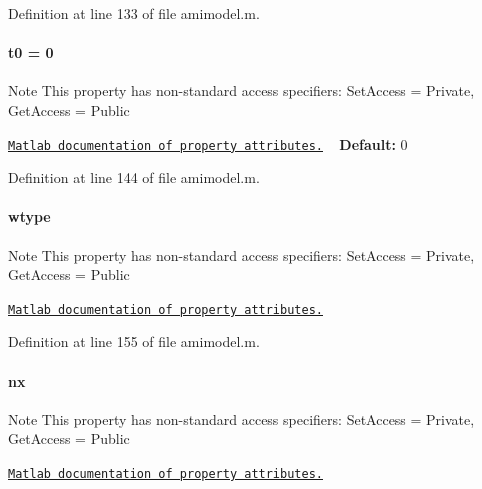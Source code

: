 Definition at line 133 of file amimodel.\+m.

\hypertarget{classamimodel_abdb5a42ffee3ca622484b53a322f1004}{}
\paragraph[{t0}]{\setlength{\rightskip}{0pt plus 5cm}t0 = 0}\label{classamimodel_abdb5a42ffee3ca622484b53a322f1004}
\begin{DoxyNote}{Note}
This property has non-\/standard access specifiers\+: {\ttfamily Set\+Access = Private, Get\+Access = Public} 

\href{http://www.mathworks.com/help/matlab/matlab_oop/property-attributes.html}{\tt Matlab documentation of property attributes.} ~\newline
{\bfseries Default\+:} 0 
\end{DoxyNote}


Definition at line 144 of file amimodel.\+m.

\hypertarget{classamimodel_a5376250224ce32fb558d88aa0b5a93ff}{}
\paragraph[{wtype}]{\setlength{\rightskip}{0pt plus 5cm}wtype}\label{classamimodel_a5376250224ce32fb558d88aa0b5a93ff}
\begin{DoxyNote}{Note}
This property has non-\/standard access specifiers\+: {\ttfamily Set\+Access = Private, Get\+Access = Public} 

\href{http://www.mathworks.com/help/matlab/matlab_oop/property-attributes.html}{\tt Matlab documentation of property attributes.} 
\end{DoxyNote}


Definition at line 155 of file amimodel.\+m.

\hypertarget{classamimodel_a84e4236f07668a770c27567f1f9615ff}{}
\paragraph[{nx}]{\setlength{\rightskip}{0pt plus 5cm}nx}\label{classamimodel_a84e4236f07668a770c27567f1f9615ff}
\begin{DoxyNote}{Note}
This property has non-\/standard access specifiers\+: {\ttfamily Set\+Access = Private, Get\+Access = Public} 

\href{http://www.mathworks.com/help/matlab/matlab_oop/property-attributes.html}{\tt Matlab documentation of property attributes.} 
\end{DoxyNote}


